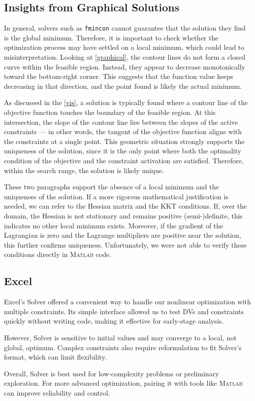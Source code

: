 \documentclass[11pt,twocolumn]{article}
\begin{document}
        \subsection{Insights from Graphical Solutions}
            In general, solvers such as \texttt{fmincon} cannot guarantee that the solution they find is the global minimum.
            Therefore, it is important to check whether the optimization process may have settled on a local minimum, which could lead to misinterpretation.
            Looking at \cref{graphical}, the contour lines do not form a closed curve within the feasible region.
            Instead, they appear to decrease monotonically toward the bottom-right corner.
            This suggests that the function value keeps decreasing in that direction, and the point found is likely the actual minimum.
            \par
            As discussed in the \cref{vis}, a solution is typically found where a contour line of the objective function touches the boundary of the feasible region.
            At this intersection, the slope of the contour line lies between the slopes of the active constraints — in other words, the tangent of the objective function aligns with the constraints at a single point.
            This geometric situation strongly supports the uniqueness of the solution, since it is the only point where both the optimality condition of the objective and the constraint activation are satisfied.
            Therefore, within the search range, the solution is likely unique.
            \par
            These two paragraphs support the absence of a local minimum and the uniqueness of the solution.
            If a more rigorous mathematical justification is needed, we can refer to the Hessian matrix and the KKT conditions.
            If, over the domain, the Hessian is not stationary and remains positive (semi-)definite, this indicates no other local minimum exists.
            Moreover, if the gradient of the Lagrangian is zero and the Lagrange multipliers are positive near the solution, this further confirms uniqueness.
            Unfortunately, we were not able to verify these conditions directly in \textsc{Matlab} code.

        \subsection{Excel}
            Excel's Solver offered a convenient way to handle our nonlinear optimization with multiple constraints.
            Its simple interface allowed us to test DVs and constraints quickly without writing code, making it effective for early-stage analysis.
            \par
            However, Solver is sensitive to initial values and may converge to a local, not global, optimum.
            Complex constraints also require reformulation to fit Solver's format, which can limit flexibility.
            \par
            Overall, Solver is best used for low-complexity problems or preliminary exploration.
            For more advanced optimization, pairing it with tools like \textsc{Matlab} can improve reliability and control.
\end{document}

